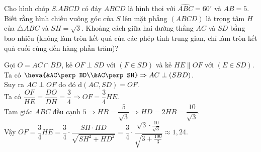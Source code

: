 \begin{ex}%
Cho hình chóp $S.ABCD$ có đáy $ABCD$ là hình thoi với $\widehat{ABC}=60^{\circ}$ và $AB=5$. Biết rằng hình chiếu vuông góc của $S$ lên mặt phẳng $(ABCD)$ là trọng tâm $H$ của $\triangle ABC$ và $SH=\sqrt{3}$. Khoảng cách giữa hai đường thẳng $AC$ và $SD$ bằng bao nhiêu (không làm tròn kết quả của các phép tính trung gian, chỉ làm tròn kết quả cuối cùng đến hàng phần trăm)?
\loigiai
{
\immini
{
Gọi $O=AC \cap BD$, kẻ $OF\perp SD$ với $(F \in SD)$ và kẻ $HE \parallel OF$ với $(E \in SD)$.\\
Ta có $\heva{&AC\perp BD\\&AC\perp SH}\Rightarrow AC\perp (SBD)$.\\
Suy ra $AC\perp OF$ do đó $\mathrm{d}(AC,SD)=OF$.\\
Ta có $\dfrac{OF}{HE}=\dfrac{DO}{DH}=\dfrac{3}{4} \Rightarrow OF=\dfrac{3}{4} HE$.\\ Tam giác $ABC$ đều cạnh $5\Rightarrow HB=\dfrac{5}{\sqrt{3}} \Rightarrow HD=2HB=\dfrac{10}{\sqrt{3}}$.\\
Vậy $OF=\dfrac{3}{4} HE=\dfrac{3}{4}\cdot\dfrac{SH\cdot HD}{\sqrt{SH^2+HD^2}}=\dfrac{3}{4}\cdot\dfrac{\sqrt{3}\cdot\tfrac{10}{\sqrt{3}}}{\sqrt{3+\tfrac{100}{3}}} \approx 1{,}24$.
}
{
}
}
\end{ex}

